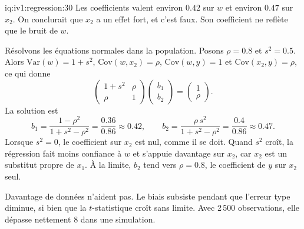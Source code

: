 \begin{solution}{iq:iv1:regression:30}
Les coefficients valent environ $0.42$ sur $w$ et environ $0.47$ sur $x_2$. On conclurait que $x_2$ a un effet fort, et c'est faux. Son coefficient ne reflète que le bruit de $w$.

Résolvons les équations normales dans la population. Posons $\rho = 0.8$ et $s^2 = 0.5$. Alors $\mathrm{Var}(w) = 1 + s^2$, $\mathrm{Cov}(w, x_2) = \rho$, $\mathrm{Cov}(w, y) = 1$ et $\mathrm{Cov}(x_2, y) = \rho$, ce qui donne
\[
\begin{pmatrix} 1 + s^2 & \rho \\ \rho & 1 \end{pmatrix}\begin{pmatrix} b_1 \\ b_2 \end{pmatrix} = \begin{pmatrix} 1 \\ \rho \end{pmatrix}.
\]
La solution est
\[
b_1 = \frac{1 - \rho^2}{1 + s^2 - \rho^2} = \frac{0.36}{0.86} \approx 0.42, \qquad b_2 = \frac{\rho\,s^2}{1 + s^2 - \rho^2} = \frac{0.4}{0.86} \approx 0.47.
\]
Lorsque $s^2 = 0$, le coefficient sur $x_2$ est nul, comme il se doit. Quand $s^2$ croît, la régression fait moins confiance à $w$ et s'appuie davantage sur $x_2$, car $x_2$ est un substitut propre de $x_1$. À la limite, $b_2$ tend vers $\rho = 0.8$, le coefficient de $y$ sur $x_2$ seul.

Davantage de données n'aident pas. Le biais subsiste pendant que l'erreur type diminue, si bien que la $t$-statistique croît sans limite. Avec 2\,500 observations, elle dépasse nettement 8 dans une simulation.

\end{solution}
